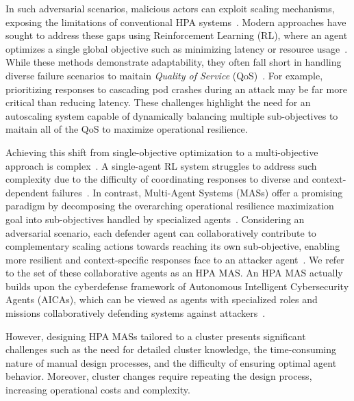 \documentclass[conference]{IEEEtran}
\begin{document}
In such adversarial scenarios, malicious actors can exploit scaling mechanisms, exposing the limitations of conventional HPA systems~\cite{Kim2020}. Modern approaches have sought to address these gaps using Reinforcement Learning (RL), where an agent optimizes a single global objective such as minimizing latency or resource usage~\cite{Nguyen2019}. While these methods demonstrate adaptability, they often fall short in handling diverse failure scenarios to maitain \textit{Quality of Service} (QoS)~\cite{Castro2020}. For example, prioritizing responses to cascading pod crashes during an attack may be far more critical than reducing latency. These challenges highlight the need for an autoscaling system capable of dynamically balancing multiple sub-objectives to maitain all of the QoS to maximize operational resilience.

Achieving this shift from single-objective optimization to a multi-objective approach is complex~\cite{Shoham2008}. A single-agent RL system struggles to address such complexity due to the difficulty of coordinating responses to diverse and context-dependent failures~\cite{Jennings1998}. In contrast, Multi-Agent Systems (MASs) offer a promising paradigm by decomposing the overarching operational resilience maximization goal into sub-objectives handled by specialized agents~\cite{Shoham2008}. Considering an adversarial scenario, each defender agent can collaboratively contribute to complementary scaling actions towards reaching its own sub-objective, enabling more resilient and context-specific responses face to an attacker agent~\cite{Jennings1998}. We refer to the set of these collaborative agents as an HPA MAS. An HPA MAS actually builds upon the cyberdefense framework of Autonomous Intelligent Cybersecurity Agents (AICAs), which can be viewed as agents with specialized roles and missions collaboratively defending systems against attackers~\cite{Kott2018}.

However, designing HPA MASs tailored to a cluster presents significant challenges such as the need for detailed cluster knowledge, the time-consuming nature of manual design processes, and the difficulty of ensuring optimal agent behavior. Moreover, cluster changes require repeating the design process, increasing operational costs and complexity.
\end{document}
